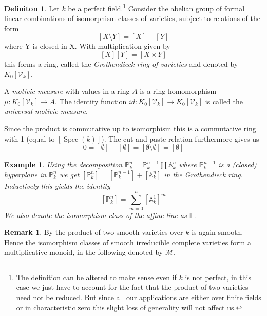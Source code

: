 \documentclass[11pt, a4paper, german]{article}
\theoremstyle{plain}
\newtheorem{example}[theorem]{Example}
\theoremstyle{definition}
\newtheorem{definition}[theorem]{Definiton}
\newtheorem{remark}[theorem]{Remark}
\newcommand{\gring}[1][k]{K_0[\mathcal{V}_#1]}
\DeclareMathOperator{\spec}{Spec}
\begin{document}
\begin{definition}
    Let $k$ be a perfect field.\footnote{The definition can be altered to make sense even if $k$ is not perfect, 
    in this case we just have to account for the fact that the product of two varieties need not be reduced. 
    But since all our applications are either over finite fields or in characteristic zero this slight loss of generality will not affect us.}
    Consider the abelian group of formal linear combinations of isomorphism classes of varieties, subject to relations of the form
    \[
        [X \setminus Y] = [X] - [Y]
    \] where Y is closed in X.
    With multiplication given by
    \[
        [X][Y] = [X \times Y]
    \]
    this forms a ring, called the \emph{Grothendieck ring of varieties} and denoted by $\gring$. 
    
    A \emph{motivic measure} with values in a ring $A$ is a ring homomorphism $\mu \colon \gring \to A$. The identity function
    $id \colon \gring \to \gring$ is called the \emph{universal motivic measure}.
\end{definition}

Since the product is commutative up to isomorphism this is a commutative ring with 1 (equal to $[\spec(k)]$). 
The cut and paste relation furthermore gives us
\[
    0 = [\emptyset] - [\emptyset] = [\emptyset \setminus \emptyset] = [\emptyset]
\]


\begin{example}
    \label{projSum}
    Using the decomposition $\mathbb{P}_k^n = \mathbb{P}_k^{n-1} \coprod \mathbb{A}_k^n$ where $\mathbb{P}_k^{n-1}$ is a (closed) hyperplane
    in $\mathbb{P}_k^n$  we get $[\mathbb{P}_k^n] = [\mathbb{P}_k^{n-1}] + [\mathbb{A}_k^n]$ in the Grothendieck ring.
    Inductively this yields the identity 
    \[
        [\mathbb{P}_k^n] = \sum_{m=0}^n [\mathbb{A}_k^1]^m
    \]
    We also denote the isomorphism class of the affine line as $\mathbb{L}$.
\end{example}

\begin{remark}
    By \cite[Prop. 10.1 (d)]{Ha} the product of two smooth varieties over $k$ is again smooth. Hence the isomorphism classes of smooth
    irreducible complete varieties form a multiplicative monoid, in the following denoted by $\mathcal{M}$.
\end{remark}
\end{document}
